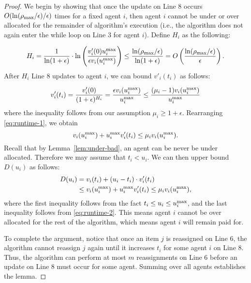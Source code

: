 \begin{proof}

We begin by showing that once the update on Line 8 occurs  $O(\ln(\rho_{\max}/\epsilon)/\epsilon)$ times for a fixed agent $i$, 
then agent $i$ cannot be under or over allocated for the remainder of algorithm's execution 
(i.e., the algorithm does not again enter the while loop on Line 3 for agent $i$). Define $H_i$ as the following:

\begin{equation*}
H_i = \frac{1}{\ln(1+\epsilon)}\cdot \ln\left(\frac{v'_i(0)u_i^{\max}}{\epsilon v_i(u_i^{\max})}\right) \leq \frac{\ln(\rho_{\max}/\epsilon)}{\ln(1+\epsilon)} = O\left(\frac{\ln(\rho_{\max}/\epsilon)}{\epsilon}\right).
\end{equation*} 
After $H_i$ Line 8 updates to agent $i$, 
we can bound $v'_i(t_i)$ as follows:

\begin{equation} 
\label{eq:runtime-1}
 v_i'(t_i) = \frac{v_i'(0)}{(1+\epsilon)^{H_i}}
= \frac{\epsilon  v_i(u_i^{\max})}{u_i^{\max}} 
\leq \frac{(\mu_i-1)v_i(u_i^{\max})}{u_i^{\max}}
\end{equation}
where the inequality follows from our assumption 
$\mu_i \geq 1+\epsilon$. Rearranging \eqref{eq:runtime-1}, we obtain
\begin{equation}
\label{eq:runtime-2}
v_i(u_i^{\max}) + u_i^{\max} v_i'(t_i) \leq \mu_i v_i(u_i^{\max}).
\end{equation}
 Recall that by Lemma~\ref{lem:under-bad}, an agent can be never be under allocated. Therefore we may assume that $t_i < u_i$. We can then upper bound $D(u_i)$ as follows:
\begin{align*} %
D(u_i) &= v_i(t_i) + (u_i - t_i)\cdot v_i'(t_i) \\
& \leq v_i(\umaxi) + \umaxi v_i'(t_i) \leq \mu_iv_i(\umaxi),
\end{align*}
where the first inequality follows from the fact 
$t_i \leq u_i \leq u_i^{\max}$, and the last inequality follows from \eqref{eq:runtime-2}. This means agent $i$ cannot be over allocated for the rest of the algorithm, which means agent $i$ will remain paid for.

To complete the argument, notice that once an item $j$ is reassigned on Line 6, the algorithm cannot reassign $j$ again until it increases $t_i$ for some agent $i$ on Line 8. 
Thus, the algorithm can perform at most $m$ reassignments on Line 6 before an update on Line 8 must occur for some agent.
Summing over all agents establishes the lemma.
\end{proof}


